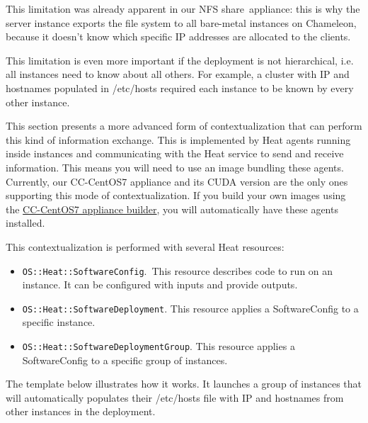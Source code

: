 This limitation was already apparent in our NFS share~appliance: this is
why the server instance exports the file system to all bare-metal
instances on Chameleon, because it doesn't know which specific IP
addresses are allocated to the clients.

This limitation is even more important if the deployment is not
hierarchical, i.e. all instances need to know about all others. For
example, a cluster with IP and hostnames populated in /etc/hosts
required each instance to be known by every other instance.

This section presents a more advanced form of contextualization that can
perform this kind of information exchange. This is implemented by Heat
agents running inside instances and communicating with the Heat service
to send and receive information. This means you will need to use an
image bundling these agents. Currently, our CC-CentOS7 appliance and its
CUDA version are the only ones supporting this mode of
contextualization. If you build your own images using the
\href{https://github.com/ChameleonCloud/CC-CentOS7}{CC-CentOS7 appliance
builder}, you will automatically have these agents installed.

This contextualization is performed with several Heat resources:

\begin{itemize}
\item
  \texttt{OS::Heat::SoftwareConfig}.~This resource describes code to run
  on an instance. It can be configured with inputs and provide outputs.
\item
  \texttt{OS::Heat::SoftwareDeployment}. This resource applies a
  SoftwareConfig to a specific instance.
\item
  \texttt{OS::Heat::SoftwareDeploymentGroup}. This resource applies a
  SoftwareConfig to a specific group of instances.
\end{itemize}

The template below illustrates how it works. It launches a group of
instances that will automatically populates their /etc/hosts file with
IP and hostnames from other instances in the deployment.

